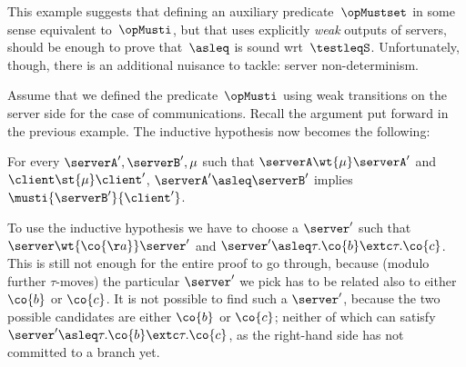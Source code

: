 \noindent
This example suggests that defining an auxiliary predicate~$\opMustset$ in some sense
equivalent to~$\opMusti$, but that uses explicitly {\em weak} outputs
of servers, should be enough to prove that~$\asleq$ is sound wrt~$\testleqS$.
Unfortunately, though, there is an additional nuisance to tackle: server
non-determinism.
\begin{example}
  Assume that we defined the predicate~$\opMusti$
  using weak transitions on the server side for the case of
  communications. Recall the argument %
  put forward in the previous example.
  The inductive hypothesis now becomes the following:
  \begin{center}
    For every $\serverA', \serverB', \mu$ such that
    $\serverA \wt{\mu} \serverA'$ and $\client \st{\mu} \client'$,
    $\serverA' \asleq \serverB'$ implies $\musti{\serverB'}{\client'}$.
  \end{center}
  To use the inductive hypothesis we have to choose a $\server'$ such
  that $\server \wt{\co{\aa}} \server'$ and $\server' \asleq
  \tau.\co{b} \extc \tau.\co{c}$. This is still not enough for the
  entire proof to go through, because (modulo further $\tau$-moves)
  the particular $\server'$ we pick has to be related also to either
  $\co{b}$ or $\co{c}$. It is not possible to find such a
    $\server'$, because
    the two possible candidates
  are either $\co{b}$
  or $\co{c}$; neither of which can satisfy $\server' \asleq
  \tau.\co{b} \extc \tau.\co{c}$, as the right-hand side has not
  committed to a branch yet.



\end{example}
